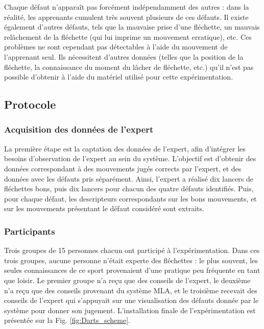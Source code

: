 Chaque défaut n'apparaît pas forcément indépendamment des autres : dans la réalité, les apprenants cumulent très souvent plusieurs de ces défauts. Il existe également d'autres défauts, tels que la mauvaise prise d'une fléchette, un mauvais relâchement de la fléchette (qui lui imprime un mouvement erratique), etc. Ces problèmes ne sont cependant pas détectables à l'aide du mouvement de l'apprenant seul. Ils nécessitent d'autres données (telles que la position de la fléchette, la connaissance du moment du lâcher de fléchette, etc.) qu'il n'est pas possible d'obtenir à l'aide du matériel utilisé pour cette expérimentation.

\subsection{Protocole}
\subsubsection{Acquisition des données de l'expert}
La première étape est la captation des données de l'expert, afin d'intégrer les besoins d'observation de l'expert au sein du système. L'objectif est d'obtenir des données correspondant à des mouvements jugés corrects par l'expert, et des données avec les défauts pris séparément. Ainsi, l'expert a réalisé dix lancers de fléchettes bons, puis dix lancers pour chacun des quatre défauts identifiés. Puis, pour chaque défaut, les descripteurs correspondants sur les bons mouvements, et sur les mouvements présentant le défaut considéré sont extraits.

\subsubsection{Participants}
Trois groupes de 15 personnes chacun ont participé à l'expérimentation. Dans ces trois groupes, aucune personne n'était experte des fléchettes : le plus souvent, les seules connaissances de ce sport provenaient d'une pratique peu fréquente en tant que loisir. Le premier groupe n'a reçu que des conseils de l'expert, le deuxième n'a reçu que des conseils provenant du système MLA, et le troisième recevait des conseils de l'expert qui s'appuyait sur une visualisation des défauts donnée par le système pour donner son jugement. L'installation finale de l'expérimentation est présentée sur la Fig. \ref{fig:Darts_scheme}.

